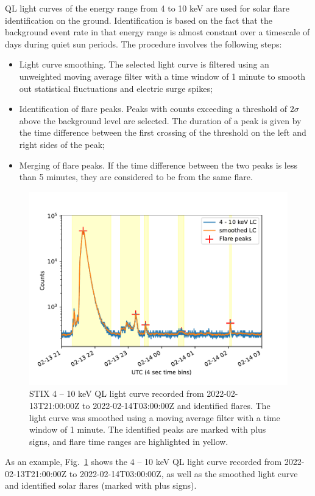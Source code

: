 \documentclass[referee]{aa} %
\begin{document}
QL light curves of the energy range from  4 to 10 keV are used for solar flare identification
on the ground. Identification is based on the fact 
that the background event rate in that energy range is almost constant 
over a timescale of days during quiet sun periods. 
The procedure involves the following steps:
\begin{itemize}
  \item Light curve smoothing. The selected light curve is filtered using an unweighted
  moving average filter with a time window of 1 minute to smooth out statistical fluctuations and electric surge spikes;
  \item Identification of flare peaks. Peaks with counts exceeding a threshold of $2\sigma$ above the background level
   are selected. The duration of a peak is given by the time difference between the first 
   crossing of the threshold on the left and right sides of the peak;  
  \item Merging of flare peaks. If the time difference between the two peaks is less than 5 minutes,
   they are considered to be from the same flare.
\end{itemize}

\begin{figure}
  \centering
  \includegraphics[width=0.8\linewidth]{figures/flaredet.pdf}
  \caption{STIX 4 -- 10 keV QL light curve recorded from  2022-02-13T21:00:00Z to 2022-02-14T03:00:00Z and 
  identified flares.   The light curve was smoothed using a moving average filter with a time window
  of 1 minute. The identified peaks are marked with plus signs, and flare time ranges are highlighted in yellow.
  }
  \label{fig:flare-det}
\end{figure}
As an example, Fig.~\ref{fig:flare-det} shows  the 4 -- 10 keV QL  light curve recorded from 
2022-02-13T21:00:00Z to 2022-02-14T03:00:00Z, as well as the smoothed light curve and  identified solar flares (marked with plus signs).
\end{document}

